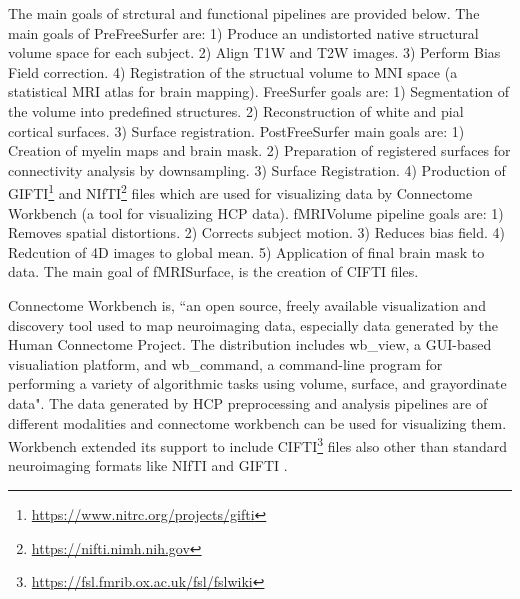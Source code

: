 The main goals of strctural and functional pipelines \cite{Gla13} are provided below. The main goals of PreFreeSurfer are: 1) Produce an undistorted native structural volume space for each subject. 2) Align T1W and T2W images. 3) Perform Bias Field correction. 4) Registration of the structual volume to MNI space (a statistical MRI atlas for brain mapping). FreeSurfer goals are: 1) Segmentation of the volume into predefined structures. 2) Reconstruction of white and pial cortical surfaces. 3) Surface registration. PostFreeSurfer main goals are: 1) Creation of myelin maps and brain mask. 2) Preparation of registered surfaces for connectivity analysis by downsampling. 3) Surface Registration. 4) Production of GIFTI\footnote{\url{https://www.nitrc.org/projects/gifti}} and NIfTI\footnote{\url{https://nifti.nimh.nih.gov}} files which are used for visualizing data by Connectome Workbench (a tool for visualizing HCP data). fMRIVolume pipeline goals are: 1) Removes spatial distortions. 2) Corrects subject motion. 3) Reduces bias field. 4) Redcution of 4D images to global mean. 5) Application of final brain mask to data. The main goal of fMRISurface, is the creation of CIFTI files.

Connectome Workbench \cite{wb_workbench} is, ``an open source, freely available visualization and discovery tool used to map neuroimaging data, especially data generated by the Human Connectome Project. The distribution includes wb\_view, a GUI-based visualiation platform, and wb\_command, a command-line program for performing a variety of algorithmic tasks using volume, surface, and grayordinate data". The data generated by HCP preprocessing and analysis pipelines are of different modalities and connectome workbench can be used for visualizing them. Workbench extended its support to include CIFTI\footnote{\url{https://fsl.fmrib.ox.ac.uk/fsl/fslwiki}} files also other than standard neuroimaging formats like NIfTI and GIFTI \cite{journals/neuroimage/MarcusHSJWGBABRHHHOMHHRHCSECE13}.
 


